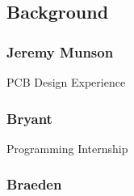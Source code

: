\subsection{Background}
	\subsubsection{Jeremy Munson}
		PCB Design Experience
	\subsubsection{Bryant}
		Programming Internship
	\subsubsection{Braeden}
		